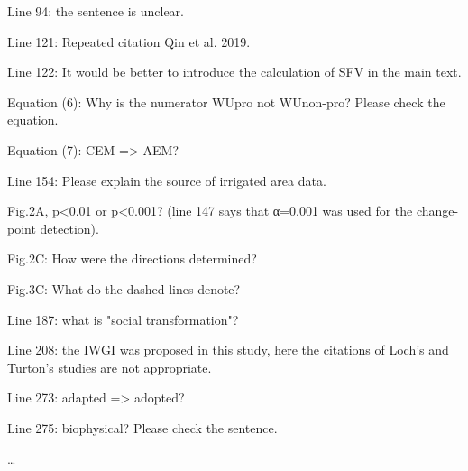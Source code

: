 \RC{} Line 94: the sentence is unclear.

\RC{} Line 121: Repeated citation Qin et al. 2019.

\RC{} Line 122: It would be better to introduce the calculation of SFV in the main text.

\RC{} Equation (6): Why is the numerator WUpro not WUnon-pro? Please check the equation.

\RC{} Equation (7): CEM => AEM?\

\RC{} Line 154: Please explain the source of irrigated area data.

\RC{} Fig.2A, p<0.01 or p<0.001? (line 147 says that α=0.001 was used for the change-point detection).

\RC{} Fig.2C: How were the directions determined?

\RC{} Fig.3C: What do the dashed lines denote?

\RC{} Line 187: what is "social transformation"?

\RC{} Line 208: the IWGI was proposed in this study, here the citations of Loch's and Turton's studies are not appropriate.

\RC{} Line 273: adapted => adopted?

\RC{} Line 275: biophysical? Please check the sentence.

\AR{} \dots
